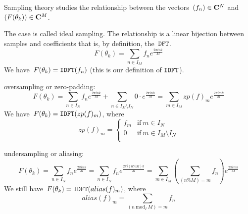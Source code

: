 Sampling theory studies the relationship between the vectors~$(f_n)\in\mathbf{C}^N$
and~\mbox{$(F(\theta_k))\in\mathbf{C}^M$}.

\bigskip

The case  is called ideal sampling.  The relationship is a linear
bijection between samples and coefficients that is, by definition, the~$\mathtt{DFT}$.
\[
	F(\theta_k)=\sum_{n\in I_M}f_ne^{\frac{2\pi ink}{M}}
\]
We have~$F(\theta_k) = \mathtt{IDFT}(f_n)$ (this is our definition of $\mathtt{IDFT}$).

 oversampling or zero-padding:
\[
	F(\theta_k)
	=
	\sum_{n\in I_N}f_ne^{\frac{2\pi ink}{M}}
	+
	\sum_{n\in I_M\setminus I_N} 0\cdot e^{\frac{2\pi ink}{M}}
	=
	\sum_{m\in I_M}zp(f)_me^{\frac{2\pi imk}{M}}
\]
We have~$F(\theta_k) = \mathtt{IDFT}(zp(f)_m)$, where
\[
	zp(f)_m = \begin{cases}
		f_m & \mathrm{if}\ m\in I_N \\
		0 & \mathrm{if}\ m\in I_M\setminus I_N \\
	\end{cases}
\]

 undersampling or aliasing:
\[
	F(\theta_k)
	=
	\sum_{n\in I_N}f_ne^{\frac{2\pi ink}{M}}
	=
	\sum_{n\in I_N}f_ne^{\frac{2\pi i(n\% M)k}{M}}
	=
	\sum_{m\in I_M}\left(\sum_{(n\%M)=m}f_n\right)e^{\frac{2\pi imk}{M}}
\]
We still have~$F(\theta_k)=\mathtt{IDFT}(alias(f)_m)$, where
\[
	alias(f)_m=\sum_{(n\ \mathrm{mod}_I\  M)=m} f_n
\]


